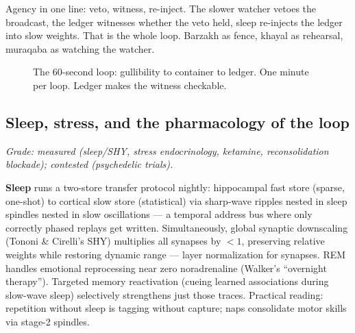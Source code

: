 \documentclass[11pt]{article}
\begin{document}
Agency in one line: veto, witness, re-inject. The slower watcher vetoes the broadcast, the ledger witnesses whether the veto held, sleep re-injects the ledger into slow weights. That is the whole loop. Barzakh as fence, khayal as rehearsal, muraqaba as watching the watcher.

\begin{figure}[h]
\centering
{}
\caption{The 60-second loop: gullibility to container to ledger. One minute per loop. Ledger makes the witness checkable.}
\label{fig:gullibility}
\end{figure}

\subsection{Sleep, stress, and the pharmacology of the loop}

\textit{Grade: measured (sleep/SHY, stress endocrinology, ketamine, reconsolidation blockade); contested (psychedelic trials).}

\textbf{Sleep} runs a two-store transfer protocol nightly: hippocampal fast store (sparse, one-shot) to cortical slow store (statistical) via sharp-wave ripples nested in sleep spindles nested in slow oscillations --- a temporal address bus where only correctly phased replays get written. Simultaneously, global synaptic downscaling (Tononi \& Cirelli's SHY) multiplies all synapses by $<1$, preserving relative weights while restoring dynamic range --- layer normalization for synapses. REM handles emotional reprocessing near zero noradrenaline (Walker's ``overnight therapy''). Targeted memory reactivation (cueing learned associations during slow-wave sleep) selectively strengthens just those traces. Practical reading: repetition without sleep is tagging without capture; naps consolidate motor skills via stage-2 spindles.
\end{document}
